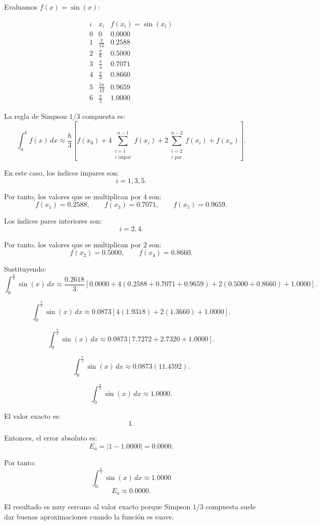\documentclass[11pt,respuestas,a4]{aleph-examen}
\begin{document}
\begin{preguntas}
\begin{respuesta}
Evaluamos $f(x)=\sin(x)$:

\[
\begin{array}{c|c|c}
i & x_i & f(x_i)=\sin(x_i) \\
\hline
0 & 0 & 0.0000 \\
1 & \frac{\pi}{12} & 0.2588 \\
2 & \frac{\pi}{6} & 0.5000 \\
3 & \frac{\pi}{4} & 0.7071 \\
4 & \frac{\pi}{3} & 0.8660 \\
5 & \frac{5\pi}{12} & 0.9659 \\
6 & \frac{\pi}{2} & 1.0000
\end{array}
\]

La regla de Simpson $1/3$ compuesta es:
\[
\int_a^b f(x)\,dx
\approx
\frac{h}{3}
\left[
f(x_0)
+
4\sum_{\substack{i=1\\i\text{ impar}}}^{n-1}f(x_i)
+
2\sum_{\substack{i=2\\i\text{ par}}}^{n-2}f(x_i)
+
f(x_n)
\right].
\]

En este caso, los índices impares son:
\[
i=1,3,5.
\]

Por tanto, los valores que se multiplican por $4$ son:
\[
f(x_1)=0.2588,
\qquad
f(x_3)=0.7071,
\qquad
f(x_5)=0.9659.
\]

Los índices pares interiores son:
\[
i=2,4.
\]

Por tanto, los valores que se multiplican por $2$ son:
\[
f(x_2)=0.5000,
\qquad
f(x_4)=0.8660.
\]

Sustituyendo:
\[
\int_0^{\frac{\pi}{2}}\sin(x)\,dx
\approx
\frac{0.2618}{3}
\left[
0.0000
+
4(0.2588+0.7071+0.9659)
+
2(0.5000+0.8660)
+
1.0000
\right].
\]

\[
\int_0^{\frac{\pi}{2}}\sin(x)\,dx
\approx
0.0873
\left[
4(1.9318)+2(1.3660)+1.0000
\right].
\]

\[
\int_0^{\frac{\pi}{2}}\sin(x)\,dx
\approx
0.0873
\left[
7.7272+2.7320+1.0000
\right].
\]

\[
\int_0^{\frac{\pi}{2}}\sin(x)\,dx
\approx
0.0873(11.4592).
\]

\[
\int_0^{\frac{\pi}{2}}\sin(x)\,dx
\approx
1.0000.
\]

El valor exacto es:
\[
1.
\]

Entonces, el error absoluto es:
\[
E_a=|1-1.0000|=0.0000.
\]

Por tanto:
\[
\boxed{\int_0^{\frac{\pi}{2}}\sin(x)\,dx\approx 1.0000}
\]
\[
\boxed{E_a\approx 0.0000}.
\]

El resultado es muy cercano al valor exacto porque Simpson $1/3$ compuesta suele dar buenas aproximaciones cuando la función es suave.
\end{respuesta}


\end{preguntas}
\end{document}
